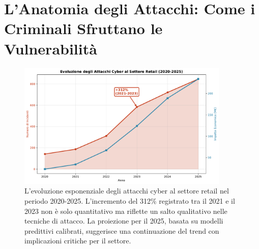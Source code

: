 \section{L'Anatomia degli Attacchi: Come i Criminali Sfruttano le Vulnerabilità}

\begin{figure}[htbp]
\centering
\includegraphics[width=0.9\textwidth]{thesis_figures/cap2/fig_2_1_cyber_evolution.pdf}
\caption{L'evoluzione esponenziale degli attacchi cyber al settore retail nel periodo 2020-2025. L'incremento del 312\% registrato tra il 2021 e il 2023 non è solo quantitativo ma riflette un salto qualitativo nelle tecniche di attacco. La proiezione per il 2025, basata su modelli predittivi calibrati, suggerisce una continuazione del trend con implicazioni critiche per il settore.}
\label{fig:cyber_evolution}
\end{figure}

